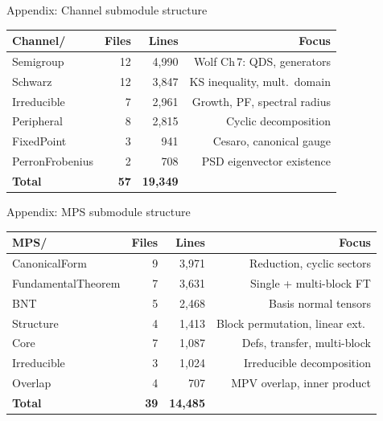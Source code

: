 \documentclass[aspectratio=169,10pt]{beamer}
\begin{document}
\begin{frame}{Appendix: Channel submodule structure}
    {\footnotesize
    \begin{center}
    \renewcommand{\arraystretch}{1.1}
    \begin{tabular}{@{}l r r r@{}}
        \toprule
        \textbf{Channel/} & \textbf{Files} & \textbf{Lines} & \textbf{Focus} \\
        \midrule
        Semigroup & 12 & 4{,}990 & Wolf Ch\,7: QDS, generators \\
        Schwarz & 12 & 3{,}847 & KS inequality, mult.\ domain \\
        Irreducible & 7 & 2{,}961 & Growth, PF, spectral radius \\
        Peripheral & 8 & 2{,}815 & Cyclic decomposition \\
        FixedPoint & 3 & 941 & Cesaro, canonical gauge \\
        PerronFrobenius & 2 & 708 & PSD eigenvector existence \\
        \midrule
        \textbf{Total} & \textbf{57} & \textbf{19{,}349} & \\
        \bottomrule
    \end{tabular}
    \end{center}
    }
\end{frame}

\begin{frame}{Appendix: MPS submodule structure}
    {\footnotesize
    \begin{center}
    \renewcommand{\arraystretch}{1.1}
    \begin{tabular}{@{}l r r r@{}}
        \toprule
        \textbf{MPS/} & \textbf{Files} & \textbf{Lines} & \textbf{Focus} \\
        \midrule
        CanonicalForm & 9 & 3{,}971 & Reduction, cyclic sectors \\
        FundamentalTheorem & 7 & 3{,}631 & Single + multi-block FT \\
        BNT & 5 & 2{,}468 & Basis normal tensors \\
        Structure & 4 & 1{,}413 & Block permutation, linear ext.\ \\
        Core & 7 & 1{,}087 & Defs, transfer, multi-block \\
        Irreducible & 3 & 1{,}024 & Irreducible decomposition \\
        Overlap & 4 & 707 & MPV overlap, inner product \\
        \midrule
        \textbf{Total} & \textbf{39} & \textbf{14{,}485} & \\
        \bottomrule
    \end{tabular}
    \end{center}
    }
\end{frame}
\end{document}
